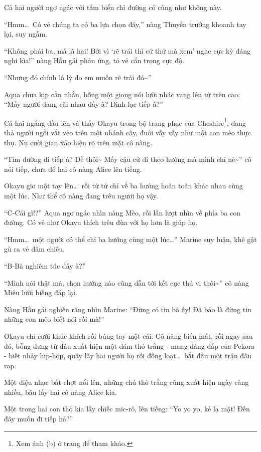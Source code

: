 \documentclass[../main.tex]{subfiles}
\begin{document}
Cả hai người ngơ ngác với tấm biển chỉ đường có cũng như không này.

``Hmm\dots\ Có vẻ chúng ta có ba lựa chọn đây,'' nàng Thuyền trưởng khoanh tay lại, suy ngẫm.

``Không phải ba, mà là hai! Bởi vì `rẽ trái thì cứ thử mà xem' nghe cực kỳ đáng nghi kìa!'' nàng Hầu gái phản ứng, tỏ vẻ cẩn trọng cực độ.

``Nhưng đó chính là lý do em muốn rẽ trái đó\~{}''

Aqua chưa kịp cằn nhằn, bỗng một giọng nói lười nhác vang lên từ trên cao: ``Mấy người đang cãi nhau đấy à? Định lạc tiếp à?''

Cả hai ngẩng đầu lên và thấy Okayu trong bộ trang phục của Cheshire\footnote{Xem ảnh (b) ở trang \pageref{wonderland} để tham khảo.}, đang thả người ngồi vắt vẻo trên một nhánh cây, đuôi vẫy vẫy như một con mèo thực thụ. Nụ cười gian xảo hiện rõ trên mặt cô nàng.

``Tìm đường đi tiếp à? Dễ thôi\~{} Mấy cậu cứ đi theo hướng mà mình chỉ nè\~{}'' cô nói tiếp, chưa để hai cô nàng Alice lên tiếng.

Okayu giơ một tay lên\dots\ rồi từ từ chỉ về ba hướng hoàn toàn khác nhau cùng một lúc. Như thể cô nàng đang trêu ngươi họ vậy.

``C-Cái gì!?'' Aqua ngơ ngác nhìn nàng Mèo, rồi lần lượt nhìn về phía ba con đường. Có vẻ như Okayu thích trêu đùa với họ hơn là giúp họ.

``Hmm\dots\ một người có thể chỉ ba hướng cùng một lúc\dots'' Marine suy luận, khẽ gật gù ra vẻ đăm chiêu.

``B-Bà nghiêm túc đấy à?''

``Mình nói thật mà, chọn hướng nào cũng dẫn tới kết cục thú vị thôi\~{}'' cô nàng Miêu lười biếng đáp lại.

Nàng Hầu gái nghiến răng nhìn Marine: ``Đừng có tin bà ấy! Đã bảo là đừng tin những con mèo biết nói rồi mà!''

Okayu chỉ cười khúc khích rồi búng tay một cái. Cô nàng biến mất, rồi ngay sau đó, bỗng dưng từ đâu xuất hiện một đám thỏ trắng - mang dáng dấp của Pekora - biết nhảy hip-hop, quây lấy hai người họ rồi đồng loạt\dots\ bắt đầu một trận đấu rap.

Một điệu nhạc bất chợt nổi lên, những chú thỏ trắng cũng xuất hiện ngày càng nhiều, bâu lấy hai cô nàng Alice kia.

Một trong hai con thỏ kia lấy chiếc mic-rô, lên tiếng: ``Yo yo yo, kẻ lạ mặt! Đến đây muốn đi tiếp hả?''
\end{document}
